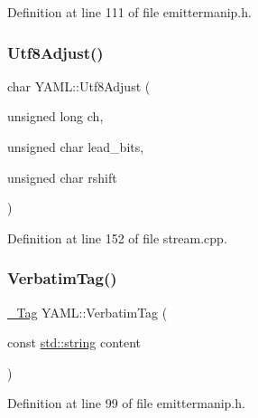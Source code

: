 Definition at line 111 of file emittermanip.\+h.

\mbox{\label{namespace_y_a_m_l_a5753660cb2a032c19a94166ac376596e}} 
\subsubsection{\texorpdfstring{Utf8Adjust()}{Utf8Adjust()}}
{\footnotesize\ttfamily char Y\+A\+M\+L\+::\+Utf8\+Adjust (\begin{DoxyParamCaption}\item[{unsigned long}]{ch,  }\item[{unsigned char}]{lead\+\_\+bits,  }\item[{unsigned char}]{rshift }\end{DoxyParamCaption})\hspace{0.3cm}{\ttfamily [inline]}}



Definition at line 152 of file stream.\+cpp.

\mbox{\label{namespace_y_a_m_l_a8ea1f58b5c3cd102ad4d6a2482f7ea31}} 
\subsubsection{\texorpdfstring{VerbatimTag()}{VerbatimTag()}}
{\footnotesize\ttfamily \mbox{\hyperlink{struct_y_a_m_l_1_1___tag}{\+\_\+\+Tag}} Y\+A\+M\+L\+::\+Verbatim\+Tag (\begin{DoxyParamCaption}\item[{const \mbox{\hyperlink{glad_8h_ac83513893df92266f79a515488701770}{std\+::string}}}]{content }\end{DoxyParamCaption})\hspace{0.3cm}{\ttfamily [inline]}}



Definition at line 99 of file emittermanip.\+h.

\mbox{\label{namespace_y_a_m_l_a2107fc2246ece5fe031db8f36cb7c292}} 
